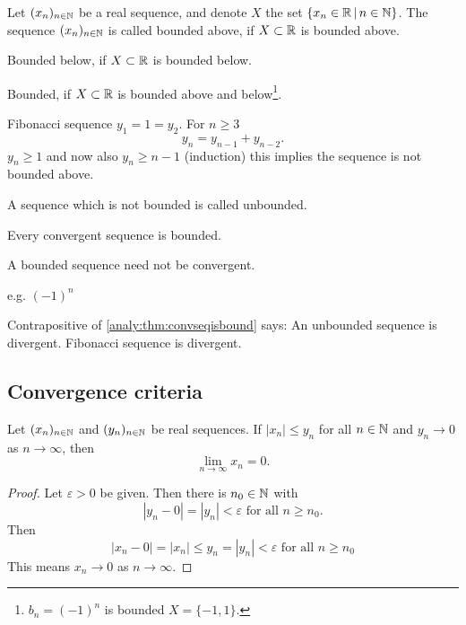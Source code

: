 \documentclass[10pt, a4paper]{article}
\newcommand{\seq}[1][x]{(#1_n)_{n \in \N}}
\begin{document}
\begin{definition}
    Let $\seq$ be a real sequence,
    and denote $X$ the set $\{x_n \in \mathbb{R} \,|\, n \in \mathbb{N}\}$.
    The sequence $\seq$ is called bounded above,
    if $X \subset \mathbb{R}$ is bounded above.

    Bounded below, if $X \subset \mathbb{R}$ is bounded below.

    Bounded, if $X \subset \mathbb{R}$ is bounded above and below\footnote{$b_n = (-1) ^ n$ is bounded $X = \{-1, 1\}$.}.
\end{definition}

\begin{example}
    Fibonacci sequence
    $y_1 = 1 = y_2$.
    For $n \geq 3$
    \[
    y_n = y_{n - 1} + y_{n - 2}.
    \]
    $y_n \geq 1$ and now also $y_n \geq n - 1$ (induction)
    this implies the sequence is not bounded above.
\end{example}
A sequence which is not bounded is called unbounded.

\begin{theorem}\label{analy:thm:convseqisbound}
    Every convergent sequence is bounded.
\end{theorem}
\begin{remark}
    A bounded sequence need not be convergent.
    
    e.g. $(-1) ^ n$
\end{remark}

Contrapositive of \autoref{analy:thm:convseqisbound} says:
An unbounded sequence is divergent.
Fibonacci sequence is divergent.

\subsection{Convergence criteria}
\begin{theorem}\label{analy:thm:squeezethm}
    Let $\seq$ and $\seq[y]$ be real sequences.
    If $|x_n| \leq y_n$ for all $n \in \mathbb{N}$ and $y_n \to 0$ as $n \to \infty$, then
    \[
    \lim_{n \to \infty}x_n = 0.
    \]
    \begin{proof}
        Let $\varepsilon > 0$ be given.
        Then there is $n_0 \in \mathbb{N}$ with
        \[
        |y_n - 0| = |y_n| < \varepsilon\text{ for all } n \geq n_0.
        \]
        Then
        \[
        |x_n - 0| = |x_n| \leq y_n = |y_n| < \varepsilon\text{ for all } n \geq n_0
        \]
        This means $x_n \to 0$ as $n \to \infty$.
    \end{proof}
\end{theorem}
\end{document}
